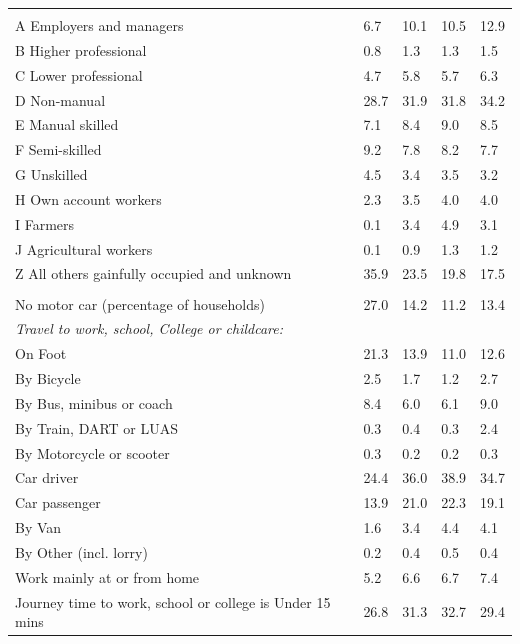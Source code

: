 \documentclass{article}
\begin{document}
\begin{table}[h]
\begin{tabular}{KTTTT}
\hline
    \\ 
    \hline
A Employers and managers &  6.7& 10.1& 10.5& 12.9\\
B Higher professional & 0.8& 1.3& 1.3& 1.5\\
C Lower professional & 4.7& 5.8& 5.7& 6.3\\
D Non-manual & 28.7& 31.9& 31.8& 34.2\\
E Manual skilled & 7.1& 8.4& 9.0& 8.5\\
F Semi-skilled & 9.2& 7.8& 8.2& 7.7\\
G Unskilled & 4.5& 3.4& 3.5& 3.2\\
H Own account workers & 2.3& 3.5& 4.0& 4.0\\
I Farmers & 0.1& 3.4& 4.9& 3.1\\
J Agricultural workers & 0.1& 0.9& 1.3& 1.2\\
Z All others gainfully occupied and unknown & 35.9& 23.5& 19.8& 17.5\\
\hline
{}\hline
    \\ 
    \hline
No motor car (percentage of households) & 27.0& 14.2& 11.2& 
13.4\\
    \hline 
\emph{Travel to work, school, College or childcare:} & & & \\
\quad On Foot & 21.3& 13.9& 11.0& 12.6\\ 
\quad By Bicycle & 2.5& 1.7& 1.2& 2.7\\ 
\quad By Bus, minibus or coach & 8.4& 6.0& 6.1& 9.0\\
\quad By Train, DART or LUAS & 0.3& 0.4& 0.3& 2.4\\
\quad By Motorcycle or scooter & 0.3& 0.2& 0.2& 0.3\\
\quad Car driver & 24.4 & 36.0& 38.9& 34.7\\
\quad Car passenger & 13.9& 21.0& 22.3& 19.1\\
\quad By Van & 1.6& 3.4& 4.4& 4.1\\
\quad By Other (incl. lorry) & 0.2& 0.4& 0.5& 0.4\\
    \hline
Work mainly at or from home & 5.2& 6.6& 6.7& 7.4\\
Journey time to work, school or college is Under 15 mins & 26.8& 31.3& 32.7& 29.4\\

\end{tabular}
\end{table}
\end{document}
